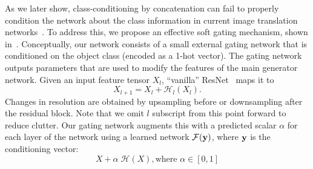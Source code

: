 As we later show, class-conditioning by concatenation can fail to properly condition the network about the class information in current image translation networks~\cite{isola2016image2image,zhu2017toward}.
%
To address this, we propose an effective soft gating mechanism, shown in~.
Conceptually, our network consists of a small external gating network that is conditioned on the object class (encoded as a 1-hot vector).
The gating network outputs parameters that are used to modify the features of the main generator network.
%
Given an input feature tensor $X_l$, ``vanilla'' ResNet~\cite{he2016deep} maps it to
\begin{equation}
X_{l+1} = X_l+\mathcal{H}_l(X_l).
\end{equation}
Changes in resolution are obtained by upsampling before or downsampling after the residual block.
Note that we omit $l$ subscript from this point forward to reduce clutter.
Our gating network augments this with a predicted scalar $\alpha$ for each layer of the network using a learned network $\mathcal{F}({\bf y})$, where ${\bf y}$ is the conditioning vector:
\begin{equation}
X + \alpha \; \mathcal{H}(X), \text{where } \alpha \in [0,1]
\end{equation}

